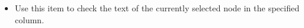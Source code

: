 
\begin{itemize}
\item Use this item to check the text of the currently selected node in the specified column.
\end{itemize}
